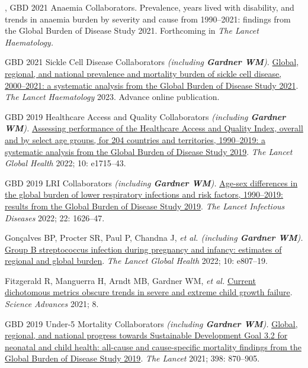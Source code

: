 \documentclass[11pt,article,oneside]{memoir}
\begin{document}
, GBD 2021 Anaemia Collaborators. Prevalence, years lived with disability, and trends in anaemia burden by severity 
and cause from 1990--2021: findings from the Global Burden of Disease Study 2021. Forthcoming in \emph{The Lancet Haematology.}

\ind GBD 2021 Sickle Cell Disease Collaborators \emph{(including \textbf{Gardner WM}).} \href{https://doi.org/10.1016/S2352-3026(23)00118-7}{Global, regional, and national prevalence and mortality burden of sickle cell disease, 2000--2021: 
a systematic analysis from the Global Burden of Disease Study 2021}. \emph{The Lancet Haematology} 2023. Advance online publication.

\ind GBD 2019 Healthcare Access and Quality Collaborators \emph{(including \textbf{Gardner WM}).} \href{https://doi.org/10.1016/S2214-109X(22)00429-6}{Assessing performance of
the Healthcare Access and Quality Index, overall and by select age groups, for 204 countries and territories,
1990--2019: a systematic analysis from the Global Burden of Disease Study 2019}. \emph{The Lancet Global Health} 2022; 10: e1715--43.

\ind GBD 2019 LRI Collaborators \emph{(including \textbf{Gardner WM}).} \href{https://doi.org/10.1016/S1473-3099(22)00510-2}{Age-sex differences in the global burden of lower
respiratory infections and risk factors, 1990--2019: results from the Global Burden of Disease Study 2019}. \emph{The Lancet Infectious Diseases} 2022; 22: 1626--47.

\ind Gonçalves BP, Procter SR, Paul P, Chandna J, \emph{et al. (including \textbf{Gardner WM}).} \href{https://doi.org/10.1016/S2214-109X(22)00093-6}{Group B streptococcus infection during pregnancy 
and infancy: estimates of regional and global burden}. \emph{The Lancet Global Health} 2022; 10: e807--19.

\ind Fitzgerald R, Manguerra H, Arndt MB, {\minbold Gardner WM}, \emph{et al.} \href{https://doi.org/10.1126/sciadv.abm8954}{Current dichotomous metrics obscure trends in
severe and extreme child growth failure}. \emph{Science Advances} 2021; 8.

\ind GBD 2019 Under-5 Mortality Collaborators \emph{(including \textbf{Gardner WM}).} \href{https://doi.org/10.1016/S0140-6736(21)01207-1}{Global, regional, and national progress
towards Sustainable Development Goal 3.2 for neonatal and child health: all-cause and cause-specific
mortality findings from the Global Burden of Disease Study 2019}. \emph{The Lancet} 2021; 398: 870--905.
\end{document}
